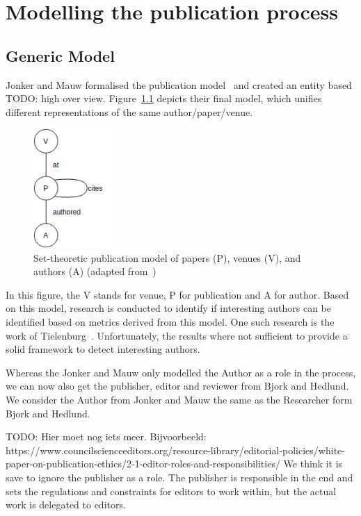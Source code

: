 \documentclass{ou-report}
\newcommand{\todo}[1]{{\color{red} TODO: #1}}
\newcommand{\outline}[1]{{\color{blue} #1}}
\begin{document}
\chapter{Modelling the publication process}
\label{chp:modelling_the_publication_process}



\section{Generic Model}

Jonker and Mauw formalised the publication model~\cite{JM2017} and created an entity based \todo{high over view}. Figure~\ref{fig:jm2017_induced_pub_model} depicts their final model, 
which unifies different representations of the same author/paper/venue.
\begin{figure}[H]
\centering
\includegraphics[width=3cm]{images/jm2017_undiced_pub_view.drawio.png}
\caption{Set-theoretic publication model of papers (P), venues (V), and authors (A) (adapted from~\cite{JM2017})}
\label{fig:jm2017_induced_pub_model}
\end{figure}
In this figure, the V stands for venue, P for publication and A for author. Based on this model, research is conducted to identify if interesting authors can be identified based on metrics derived from this model. One such research is the work of Tielenburg~\cite{TEJ2017}. Unfortunately, the results where not sufficient to provide a solid framework to detect interesting authors.



Whereas the Jonker and Mauw only modelled the Author as a role in the process, we can now also get the publisher, editor and reviewer from Bjork and Hedlund. We consider the Author from Jonker and Mauw the same as the Researcher form Bjork and Hedlund.

\todo{Hier moet nog iets meer. Bijvoorbeeld: https://www.councilscienceeditors.org/resource-library/editorial-policies/white-paper-on-publication-ethics/2-1-editor-roles-and-responsibilities/}
\outline{We think it is save to ignore the publisher as a role. The publisher is responsible in the end and sets the regulations and constraints for editors to work within, but the actual work is delegated to editors.}
\end{document}
